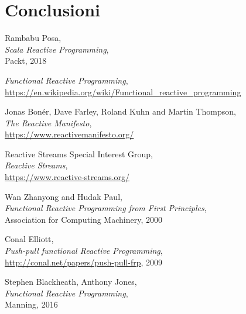 \documentclass{report}
\begin{document}
\newpage
\chapter{Conclusioni}\label{conclusioni}


\newpage
\begin{thebibliography}{4}

Rambabu Posa, \\ \textit{Scala Reactive Programming}, \\ Packt, 2018

\textit{Functional Reactive Programming}, \\
\url{https://en.wikipedia.org/wiki/Functional_reactive_programming}

Jonas Bonér, Dave Farley, Roland Kuhn and Martin Thompson, \\ \textit{The Reactive Manifesto}, \\
  \url{https://www.reactivemanifesto.org/}

Reactive Streams Special Interest Group, \\ \textit{Reactive Streams}, \\
  \url{https://www.reactive-streams.org/}

Wan Zhanyong and Hudak Paul, \\ \textit{Functional Reactive Programming from First Principles}, \\
Association for Computing Machinery, 2000

Conal Elliott, \\ \textit{Push-pull functional Reactive Programming}, \\
\url{http://conal.net/papers/push-pull-frp}, 2009

Stephen Blackheath, Anthony Jones, \\ \textit{Functional Reactive Programming}, \\
Manning, 2016

\end{thebibliography}
\end{document}
